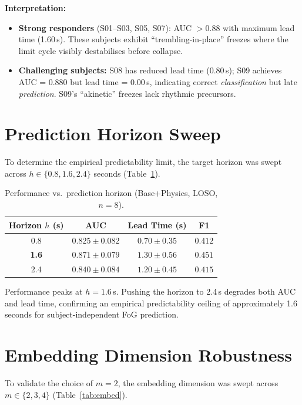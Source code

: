 \documentclass[12pt,a4paper,oneside]{report}
\numberwithin{equation}{chapter}
\numberwithin{figure}{chapter}
\numberwithin{table}{chapter}
\begin{document}
\noindent\textbf{Interpretation:}
\begin{itemize}[leftmargin=*, itemsep=3pt]
  \item \textbf{Strong responders} (S01--S03, S05, S07): AUC $> 0.88$ with maximum lead time (1.60\,s). These subjects exhibit ``trembling-in-place'' freezes where the limit cycle visibly destabilises before collapse.
  \item \textbf{Challenging subjects:} S08 has reduced lead time (0.80\,s); S09 achieves AUC = 0.880 but lead time = 0.00\,s, indicating correct \textit{classification} but late \textit{prediction}. S09's ``akinetic'' freezes lack rhythmic precursors.
\end{itemize}

\section{Prediction Horizon Sweep}

To determine the empirical predictability limit, the target horizon was swept across $h \in \{0.8, 1.6, 2.4\}$ seconds (Table~\ref{tab:horizon}).

\begin{table}[ht]
\centering
\caption{Performance vs.\ prediction horizon (Base+Physics, LOSO, $n=8$).}
\label{tab:horizon}
\renewcommand{\arraystretch}{1.25}
\begin{tabular}{cccc}
\toprule
\textbf{Horizon $h$ (s)} & \textbf{AUC} & \textbf{Lead Time (s)} & \textbf{F1} \\
\midrule
0.8  & $0.825 \pm 0.082$ & $0.70 \pm 0.35$ & $0.412$ \\
\textbf{1.6}  & $\mathbf{0.871 \pm 0.079}$ & $\mathbf{1.30 \pm 0.56}$ & $\mathbf{0.451}$ \\
2.4  & $0.840 \pm 0.084$ & $1.20 \pm 0.45$ & $0.415$ \\
\bottomrule
\end{tabular}
\end{table}

Performance peaks at $h = 1.6$\,s. Pushing the horizon to 2.4\,s degrades both AUC and lead time, confirming an empirical predictability ceiling of approximately 1.6 seconds for subject-independent FoG prediction.

\section{Embedding Dimension Robustness}

To validate the choice of $m = 2$, the embedding dimension was swept across $m \in \{2, 3, 4\}$ (Table~\ref{tab:embed}).
\end{document}

